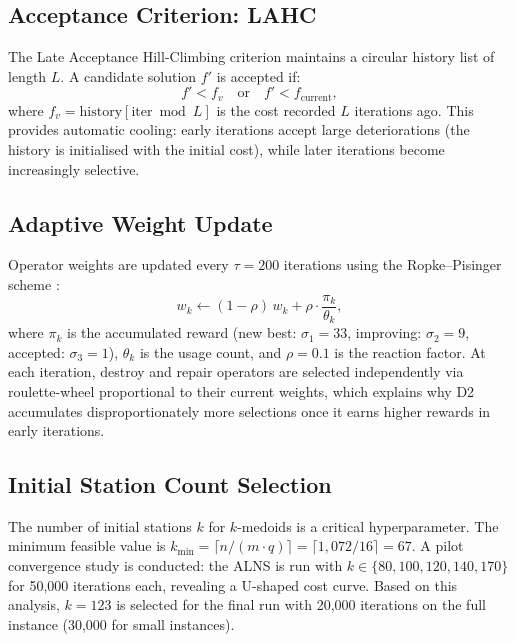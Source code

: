 \documentclass[11pt,a4paper]{article}
\begin{document}
\subsection{Acceptance Criterion: LAHC}

The Late Acceptance Hill-Climbing criterion maintains a circular history list of length $L$.
A candidate solution $f'$ is accepted if:
\begin{equation}
  f' < f_{v} \quad \text{or} \quad f' < f_{\text{current}},
\end{equation}
where $f_v = \text{history}[\text{iter} \bmod L]$ is the cost recorded $L$ iterations ago.
This provides automatic cooling: early iterations accept large deteriorations (the history is initialised with the initial cost), while later iterations become increasingly selective.

\subsection{Adaptive Weight Update}

Operator weights are updated every $\tau = 200$ iterations using the Ropke--Pisinger scheme \cite{ropke2006}:
\begin{equation}
  w_k \leftarrow (1 - \rho)\, w_k + \rho \cdot \frac{\pi_k}{\theta_k},
\end{equation}
where $\pi_k$ is the accumulated reward (new best: $\sigma_1 = 33$, improving: $\sigma_2 = 9$, accepted: $\sigma_3 = 1$), $\theta_k$ is the usage count, and $\rho = 0.1$ is the reaction factor.
At each iteration, destroy and repair operators are selected independently via roulette-wheel proportional to their current weights, which explains why D2 accumulates disproportionately more selections once it earns higher rewards in early iterations.

\subsection{Initial Station Count Selection}
\label{sec:q1c-kscan}

The number of initial stations $k$ for $k$-medoids is a critical hyperparameter.
The minimum feasible value is $k_{\min} = \lceil n / (m \cdot q) \rceil = \lceil 1{,}072/16 \rceil = 67$.
A pilot convergence study is conducted: the ALNS is run with $k \in \{80, 100, 120, 140, 170\}$ for 50,000 iterations each, revealing a U-shaped cost curve.
Based on this analysis, $k = 123$ is selected for the final run with 20,000 iterations on the full instance (30,000 for small instances).
\end{document}

